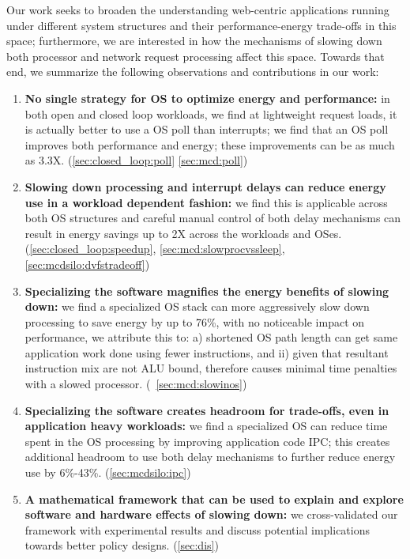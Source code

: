 Our work seeks to broaden the understanding web-centric applications running under different system structures and their performance-energy trade-offs in this space; furthermore, we are interested in how the mechanisms of slowing down both processor and network request processing affect this space. Towards that end, we summarize the following observations and contributions in our work:
\begin{enumerate}
    \item \textbf{No single strategy for OS to optimize energy and performance:} in both open and closed loop workloads, we find at lightweight request loads, it is actually better to use a OS poll than interrupts; we find that an OS poll improves both performance and energy; these improvements can be as much as 3.3X. (\cref{sec:closed_loop:poll} \cref{sec:mcd:poll}) 
    \item \textbf{Slowing down processing and interrupt delays can reduce energy use in a workload dependent fashion:} we find this is applicable across both OS structures and careful manual control of both delay mechanisms can result in energy savings up to 2X across the workloads and OSes. (\cref{sec:closed_loop:speedup}, \cref{sec:mcd:slowprocvssleep}, \cref{sec:mcdsilo:dvfstradeoff})
    \item \textbf{Specializing the software magnifies the energy benefits of slowing down:} we find a specialized OS stack can more aggressively slow down processing to save energy by up to 76\%, with no noticeable impact on performance, we attribute this to: a) shortened OS path length can get same application work done using fewer instructions, and ii) given that resultant instruction mix are not ALU bound, therefore causes minimal time penalties with a slowed processor. (~\cref{sec:mcd:slowinos})
    \item \textbf{Specializing the software creates headroom for trade-offs, even in application heavy workloads:} we find a specialized OS can reduce time spent in the OS processing by improving application code IPC; this creates additional headroom to use both delay mechanisms to further reduce energy use by 6\%-43\%. (\cref{sec:mcdsilo:ipc}) 
    \item \textbf{A mathematical framework that can be used to explain and explore software and hardware effects of slowing down:} we cross-validated our framework with experimental results and discuss potential implications towards better policy designs. (\cref{sec:dis})
\end{enumerate}

